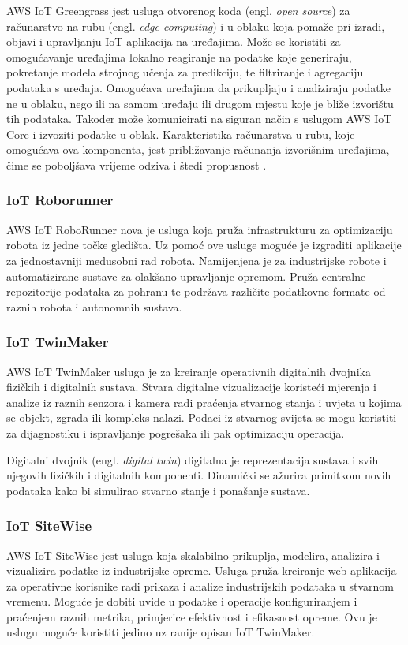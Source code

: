 AWS IoT Greengrass jest usluga otvorenog koda (engl. \textit{open source}) za računarstvo na rubu (engl. \textit{edge computing}) i u oblaku koja pomaže pri izradi, objavi i upravljanju IoT aplikacija na uređajima. Može se koristiti za omogućavanje uređajima lokalno reagiranje na podatke koje generiraju, pokretanje modela strojnog učenja za predikciju, te filtriranje i agregaciju podataka s uređaja. Omogućava uređajima da prikupljaju i analiziraju podatke ne u oblaku, nego ili na samom uređaju ili drugom mjestu koje je bliže izvorištu tih podataka. Također može komunicirati na siguran način s uslugom AWS IoT Core i izvoziti podatke u oblak. Karakteristika računarstva u rubu, koje omogućava ova komponenta, jest približavanje računanja izvorišnim uređajima, čime se poboljšava vrijeme odziva i štedi propusnost \cite{what_is_edge}.

\subsubsection{IoT Roborunner}

AWS IoT RoboRunner nova je usluga koja pruža infrastrukturu za optimizaciju robota iz jedne točke gledišta. Uz pomoć ove usluge moguće je izgraditi aplikacije za jednostavniji međusobni rad robota. Namijenjena je za industrijske robote i automatizirane sustave za olakšano upravljanje opremom. Pruža centralne repozitorije podataka za pohranu te podržava različite podatkovne formate od raznih robota i autonomnih sustava.

\subsubsection{IoT TwinMaker}

AWS IoT TwinMaker usluga je za kreiranje operativnih digitalnih dvojnika fizičkih i digitalnih sustava. Stvara digitalne vizualizacije koristeći mjerenja i analize iz raznih senzora i kamera radi praćenja stvarnog stanja i uvjeta u kojima se objekt, zgrada ili kompleks nalazi. Podaci iz stvarnog svijeta se mogu koristiti za dijagnostiku i ispravljanje pogrešaka ili pak optimizaciju operacija. 

Digitalni dvojnik (engl. \textit{digital twin}) digitalna je reprezentacija sustava i svih njegovih fizičkih i digitalnih komponenti. Dinamički se ažurira primitkom novih podataka kako bi simulirao stvarno stanje i ponašanje sustava. 


\subsubsection{IoT SiteWise}

AWS IoT SiteWise jest usluga koja skalabilno prikuplja, modelira, analizira i vizualizira podatke iz industrijske opreme. Usluga pruža kreiranje web aplikacija za operativne korisnike radi prikaza i analize industrijskih podataka u stvarnom vremenu. Moguće je dobiti uvide u podatke i operacije konfiguriranjem i praćenjem raznih metrika, primjerice efektivnost i efikasnost opreme. Ovu je uslugu moguće koristiti jedino uz ranije opisan IoT TwinMaker.

\eject